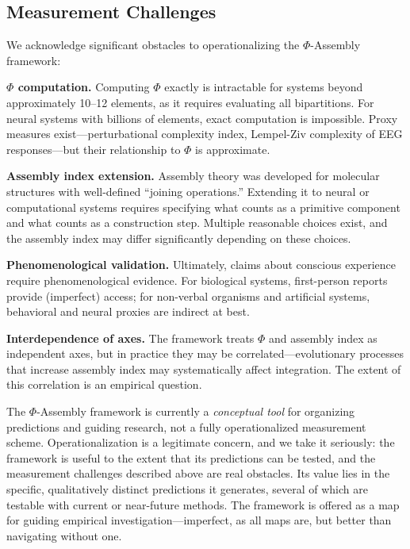\documentclass[11pt,a4paper]{article}
\theoremstyle{definition}
\theoremstyle{plain}
\theoremstyle{remark}
\begin{document}
\subsection{Measurement Challenges}\label{sec:challenges}

We acknowledge significant obstacles to operationalizing the $\Phi$-Assembly framework:

\textbf{$\Phi$ computation.} Computing $\Phi$ exactly is intractable for systems beyond approximately 10--12 elements, as it requires evaluating all bipartitions. For neural systems with billions of elements, exact computation is impossible. Proxy measures exist---perturbational complexity index, Lempel-Ziv complexity of EEG responses---but their relationship to $\Phi$ is approximate.

\textbf{Assembly index extension.} Assembly theory was developed for molecular structures with well-defined ``joining operations.'' Extending it to neural or computational systems requires specifying what counts as a primitive component and what counts as a construction step. Multiple reasonable choices exist, and the assembly index may differ significantly depending on these choices.

\textbf{Phenomenological validation.} Ultimately, claims about conscious experience require phenomenological evidence. For biological systems, first-person reports provide (imperfect) access; for non-verbal organisms and artificial systems, behavioral and neural proxies are indirect at best.

\textbf{Interdependence of axes.} The framework treats $\Phi$ and assembly index as independent axes, but in practice they may be correlated---evolutionary processes that increase assembly index may systematically affect integration. The extent of this correlation is an empirical question.

The $\Phi$-Assembly framework is currently a \textit{conceptual tool} for organizing predictions and guiding research, not a fully operationalized measurement scheme. Operationalization is a legitimate concern, and we take it seriously: the framework is useful to the extent that its predictions can be tested, and the measurement challenges described above are real obstacles. Its value lies in the specific, qualitatively distinct predictions it generates, several of which are testable with current or near-future methods. The framework is offered as a map for guiding empirical investigation---imperfect, as all maps are, but better than navigating without one.
\end{document}
